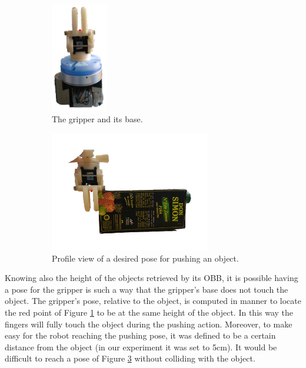 \begin{figure}[tb]
\begin{subfigure}[t]{0.25\textwidth}
\centering
\includegraphics[width=2.5cm]{Img/set_up/gripper_side2.png}
\caption{The gripper and its base.}\label{fig:gripper_side}
\end{subfigure}
\begin{subfigure}[t]{0.7\textwidth}
\centering
\includegraphics[width=7cm]{Img/pushing/pushing1.png}
\caption{Profile view of a desired pose for pushing an object.}\label{fig:pushing_pose}
\end{subfigure}
\caption{}
\end{figure}



Knowing also the height of the objects retrieved by its OBB, it is possible having a pose for the gripper is such a way that the gripper's base does not touch the object. The gripper's pose, relative to the object, is computed in manner to locate the red point of Figure \ref{fig:gripper_side} to be at the same height of the object. In this way the fingers will fully touch the object during the pushing action. Moreover, to make easy for the robot reaching the pushing pose, it was defined to be a certain distance from the object (in our experiment it was set to 5cm). It would be difficult to reach a pose of Figure \ref{fig:pushing_pose} without colliding with the object.  

